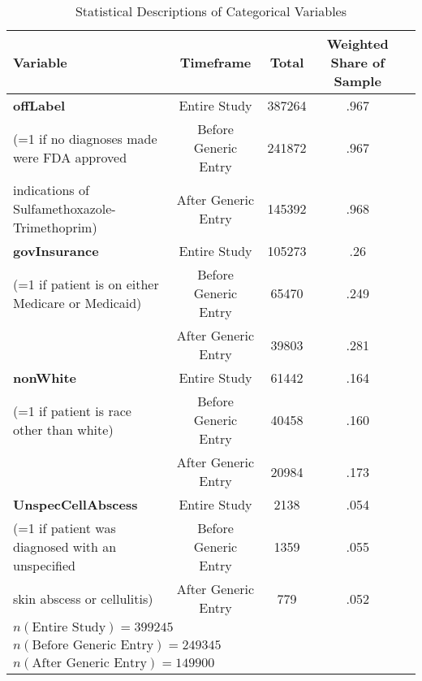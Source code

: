 \begin{table}[htbp]\centering
\def\sym#1{\ifmmode^{#1}\else\(^{#1}\)\fi}
\caption{Statistical Descriptions of Categorical Variables\label{tab1}}
\begin{tabular}{l*{4}{c}}
\hline\hline
            Variable&\multicolumn{1}{c}{Timeframe}&\multicolumn{1}{c}{Total}&\multicolumn{1}{c}{Weighted Share of Sample}\\
\hline
\textbf{offLabel}                                                &     Entire Study&             387264&      .967\\
(=1 if no diagnoses made were FDA approved          &     Before Generic Entry&    241872&      .967\\
indications of Sulfamethoxazole-Trimethoprim)  &     After Generic Entry&      145392&      .968\\
[1em]
\textbf{govInsurance}                                            &     Entire Study&             105273&      .26 \\
(=1 if patient is on either Medicare or Medicaid)       &     Before Generic Entry&     65470 &      .249\\
                                                        &     After Generic Entry&      39803 &      .281\\
[1em]
\textbf{nonWhite}                                                &     Entire Study&             61442&      .164\\
(=1 if patient is race other than white)                &     Before Generic Entry&     40458&      .160\\
                                                        &     After Generic Entry&      20984&      .173\\
[1em]
\textbf{UnspecCellAbscess}                                       &     Entire Study&             2138 &      .054\\
(=1 if patient was diagnosed with an unspecified        &     Before Generic Entry&     1359 &      .055\\
skin abscess or cellulitis)                            &     After Generic Entry&      779  &      .052\\
\hline
$n(\text{Entire Study}) = 399245$\\
$n(\text{Before Generic Entry}) = 249345$\\
$n(\text{After Generic Entry}) = 149900$\\
\hline\hline
\end{tabular}
\label{tab:Table4.3}
\end{table}

